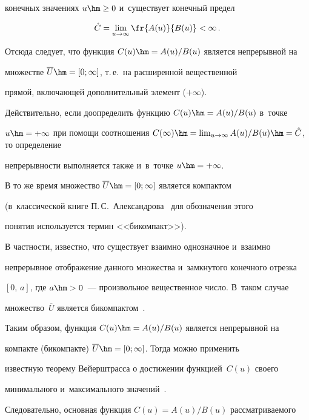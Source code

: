 конечных значениях $u\hm\geq 0$ и~существует конечный предел 

  $$

  \hat{C}=\lim\limits_{u\to\infty} \fr{A(u)}{B(u)}<\infty\,.

  $$

  

  Отсюда следует, что функция $C(u)\hm=A(u)/B(u)$ является непрерывной на 

множестве $\overline{U}\hm=[0;\infty]$, т.\,е.\ на расширенной вещественной 

прямой, включающей дополнительный элемент ($+\infty$).

  

  Действительно, если доопределить функцию $C(u)\hm=A(u)/B(u)$ в~точке 

$u\hm=+\infty$ при помощи соотношения $C(\infty)\hm= 

\lim\nolimits_{u\to\infty} A(u)/B(u)\hm= \hat{C}$, то определение 

непрерывности выполняется также и~в~точке $u\hm=+\infty$.

  

  В то же время множество $\overline{U}\hm=[0;\infty]$ является компактом 

(в~классической книге П.\,С.~Александрова~\cite{18-sh} для обозначения этого 

понятия используется термин <<бикомпакт>>). 


  В частности, известно, что существует взаимно однозначное и~взаимно 

непрерывное отображение данного множества и~замкнутого конечного отрезка 

$[0,\,a]$, где $a\hm>0$~--- произвольное вещественное число. В~таком случае 

множество~$\overline{U}$ является бикомпактом~\cite{18-sh}.

  

  Таким образом, функция $C(u)\hm=A(u)/B(u)$ является непрерывной на 

компакте (бикомпакте) $\overline{U}\hm=[0;\infty]$. Тогда можно применить 

известную теорему Вейерштрасса о достижении функцией~$C(u)$ своего 

минимального и~максимального значений~\cite{18-sh, 19-sh}.

  

  Следовательно, основная функция $C(u)=A(u)/B(u)$ рассматриваемого  

